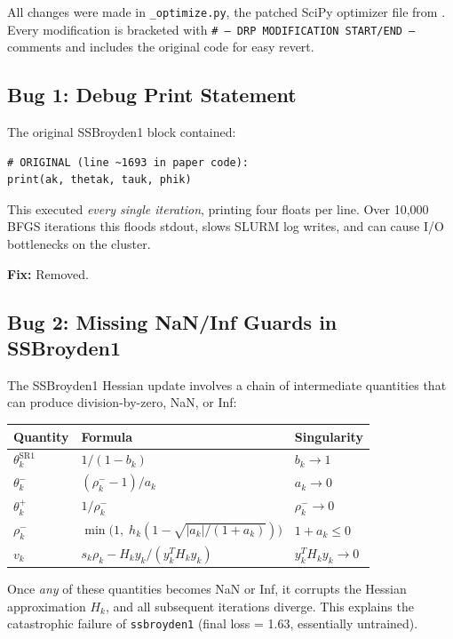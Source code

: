 \documentclass[11pt,a4paper]{article}
\begin{document}
All changes were made in \texttt{\_optimize.py}, the patched SciPy
optimizer file from \cite{kiyani2025}.  Every modification is bracketed
with \texttt{\# --- DRP MODIFICATION START/END ---} comments and includes
the original code for easy revert.

\subsection{Bug 1: Debug Print Statement}
\label{sec:bug-print}

The original SSBroyden1 block contained:
\begin{lstlisting}[caption={Original debug print (removed)}]
# ORIGINAL (line ~1693 in paper code):
print(ak, thetak, tauk, phik)
\end{lstlisting}
This executed \emph{every single iteration}, printing four floats per
line.  Over 10{,}000 BFGS iterations this floods stdout, slows SLURM
log writes, and can cause I/O bottlenecks on the cluster.

\textbf{Fix:} Removed.

\subsection{Bug 2: Missing NaN/Inf Guards in SSBroyden1}
\label{sec:bug-nan}

The SSBroyden1 Hessian update involves a chain of intermediate
quantities that can produce division-by-zero, NaN, or Inf:

\begin{center}
\renewcommand{\arraystretch}{1.3}
\begin{tabular}{@{}lll@{}}
\toprule
\textbf{Quantity} & \textbf{Formula} & \textbf{Singularity} \\
\midrule
$\theta_k^{\mathrm{SR1}}$ & $1 / (1 - b_k)$ & $b_k \to 1$ \\
$\theta_k^{-}$ & $(\rho_k^{-} - 1) / a_k$ & $a_k \to 0$ \\
$\theta_k^{+}$ & $1 / \rho_k^{-}$ & $\rho_k^{-} \to 0$ \\
$\rho_k^{-}$ & $\min\!\bigl(1,\; h_k(1 - \sqrt{|a_k|/(1+a_k)})\bigr)$ & $1 + a_k \le 0$ \\
$v_k$ & $s_k \rho_k - H_k y_k / (y_k^T H_k y_k)$ & $y_k^T H_k y_k \to 0$ \\
\bottomrule
\end{tabular}
\end{center}

Once \emph{any} of these quantities becomes NaN or Inf, it corrupts
the Hessian approximation $H_k$, and all subsequent iterations diverge.
This explains the catastrophic failure of \texttt{ssbroyden1} (final
loss = 1.63, essentially untrained).
\end{document}
